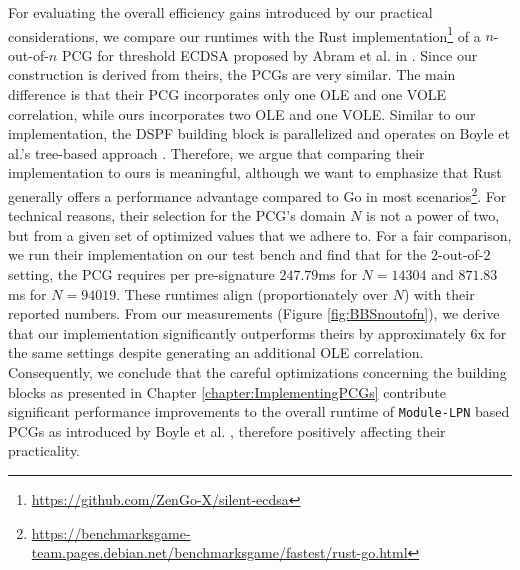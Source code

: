 For evaluating the overall efficiency gains introduced by our practical considerations, we compare our runtimes with the Rust implementation\footnote{\url{https://github.com/ZenGo-X/silent-ecdsa}} of a $n$-out-of-$n$ PCG for threshold ECDSA proposed by Abram et al. in \cite{abram2022low}. Since our construction is derived from theirs, the PCGs are very similar. The main difference is that their PCG incorporates only one OLE and one VOLE correlation, while ours incorporates two OLE and one VOLE. Similar to our implementation, the DSPF building block is parallelized and operates on Boyle et al.'s tree-based approach \cite{boyle2016function}. Therefore, we argue that comparing their implementation to ours is meaningful, although we want to emphasize that Rust generally offers a performance advantage compared to Go in most scenarios\footnote{\url{https://benchmarksgame-team.pages.debian.net/benchmarksgame/fastest/rust-go.html}}. For technical reasons, their selection for the PCG's domain $N$ is not a power of two, but from a given set of optimized values that we adhere to. For a fair comparison, we run their implementation on our test bench and find that for the $2$-out-of-$2$ setting, the PCG requires per pre-signature $247.79$ms for $N=14304$ and $871.83$ms for $N=94019$. These runtimes align (proportionately over $N$) with their reported numbers. From our measurements (Figure \ref{fig:BBSnoutofn}), we derive that our implementation significantly outperforms theirs by approximately $6$x for the same settings despite generating an additional OLE correlation. Consequently, we conclude that the careful optimizations concerning the building blocks as presented in Chapter \ref{chapter:ImplementingPCGs} contribute significant performance improvements to the overall runtime of \texttt{Module-LPN} based PCGs as introduced by Boyle et al. \cite{boyle2020efficient}, therefore positively affecting their practicality. 

